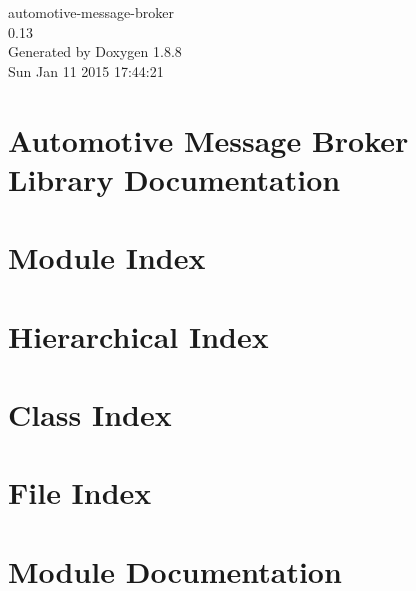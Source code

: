 \documentclass[twoside]{book}
\newcommand{\+}{\discretionary{\mbox{\scriptsize$\hookleftarrow$}}{}{}}
\newcommand{\clearemptydoublepage}{%
  \newpage{\pagestyle{empty}\cleardoublepage}%
}
\begin{document}
\hypersetup{pageanchor=false,
             bookmarks=true,
             bookmarksnumbered=true,
             pdfencoding=unicode
            }
\begin{titlepage}
\vspace*{7cm}
\begin{center}%
{\Large automotive-\/message-\/broker \\[1ex]\large 0.\+13 }\\
\vspace*{1cm}
{\large Generated by Doxygen 1.8.8}\\
\vspace*{0.5cm}
{\small Sun Jan 11 2015 17:44:21}\\
\end{center}
\end{titlepage}
\clearemptydoublepage
\tableofcontents
\clearemptydoublepage
{}
\hypersetup{pageanchor=true}

\chapter{Automotive Message Broker Library Documentation}
\label{index}\hypertarget{index}{}
\chapter{Module Index}

\chapter{Hierarchical Index}

\chapter{Class Index}

\chapter{File Index}

\chapter{Module Documentation}

\end{document}
